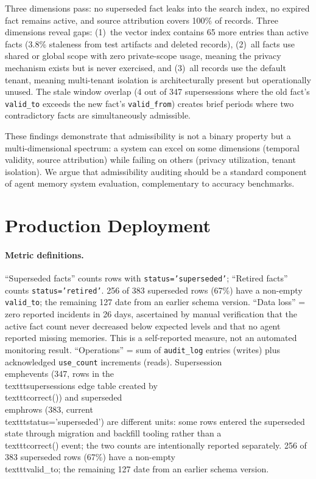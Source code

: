 \documentclass{article}
\begin{document}
Three dimensions pass: no superseded fact leaks into the search index, no expired fact remains active, and source attribution covers 100\% of records. Three dimensions reveal gaps: (1)~the vector index contains 65 more entries than active facts (3.8\% staleness from test artifacts and deleted records), (2)~all facts use shared or global scope with zero private-scope usage, meaning the privacy mechanism exists but is never exercised, and (3)~all records use the default tenant, meaning multi-tenant isolation is architecturally present but operationally unused. The stale window overlap (4 out of 347 supersessions where the old fact's \texttt{valid\_to} exceeds the new fact's \texttt{valid\_from}) creates brief periods where two contradictory facts are simultaneously admissible.

These findings demonstrate that admissibility is not a binary property but a multi-dimensional spectrum: a system can excel on some dimensions (temporal validity, source attribution) while failing on others (privacy utilization, tenant isolation). We argue that admissibility auditing should be a standard component of agent memory system evaluation, complementary to accuracy benchmarks.

\section{Production Deployment}
\label{sec:production}



\paragraph{Metric definitions.}
``Superseded facts'' counts rows with \texttt{status='superseded'}; ``Retired facts'' counts \texttt{status='retired'}. 256 of 383 superseded rows (67\%) have a non-empty \texttt{valid\_to}; the remaining 127 date from an earlier schema version. ``Data loss'' = zero reported incidents in 26 days, ascertained by manual verification that the active fact count never decreased below expected levels and that no agent reported missing memories. This is a self-reported measure, not an automated monitoring result. ``Operations'' = sum of \texttt{audit\_log} entries (writes) plus acknowledged \texttt{use\_count} increments (reads).
Supersession \\emph{events} (347, rows in the \\texttt{supersessions} edge table created by \\texttt{correct()}) and superseded \\emph{rows} (383, current \\texttt{status='superseded'}) are different units: some rows entered the superseded state through migration and backfill tooling rather than a \\texttt{correct()} event; the two counts are intentionally reported separately. 256 of 383 superseded rows (67\%) have a non-empty \\texttt{valid\_to}; the remaining 127 date from an earlier schema version.
\end{document}

